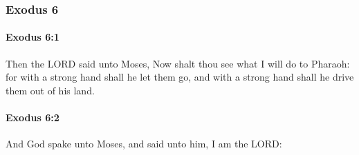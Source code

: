 	\subsubsection{Exodus 6} %
		\label{EXODUS-6}

		\paragraph{Exodus 6:1} %
			\label{EXODUS-6-1}

			Then the LORD said unto Moses, Now shalt thou see what I will do to Pharaoh: for with a strong hand shall he let them go, and with a strong hand shall he drive them out of his land.


		\paragraph{Exodus 6:2} %
			\label{EXODUS-6-2}

			And God spake unto Moses, and said unto him, I am the LORD:


